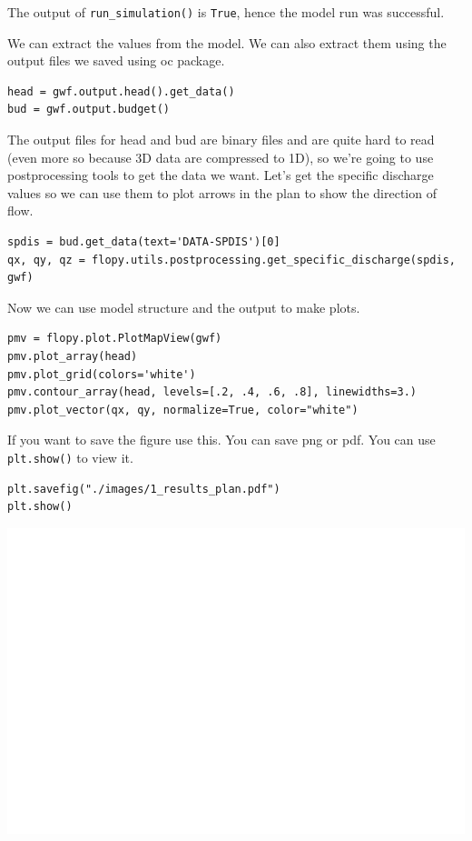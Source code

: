 \documentclass[titlepage,12pt]{unisubmission}
\begin{document}
The output of \texttt{run\_simulation()} is \texttt{True}, hence the model run was successful.

We can extract the values from the model. We can also extract them using the output files we saved using oc package.

\begin{verbatim}
head = gwf.output.head().get_data()
bud = gwf.output.budget()
\end{verbatim}

The output files for head and bud are binary files and are quite hard to read (even more so because 3D data are compressed to 1D), so we're going to use postprocessing tools to get the data we want. Let's get the specific discharge values so we can use them to plot arrows in the plan to show the direction of flow.

\begin{verbatim}
spdis = bud.get_data(text='DATA-SPDIS')[0]
qx, qy, qz = flopy.utils.postprocessing.get_specific_discharge(spdis, gwf)
\end{verbatim}

Now we can use model structure and the output to make plots.

\begin{verbatim}
pmv = flopy.plot.PlotMapView(gwf)
pmv.plot_array(head)
pmv.plot_grid(colors='white')
pmv.contour_array(head, levels=[.2, .4, .6, .8], linewidths=3.)
pmv.plot_vector(qx, qy, normalize=True, color="white")
\end{verbatim}

If you want to save the figure use this. You can save png or pdf. You can use \texttt{plt.show()} to view it.
\begin{verbatim}
plt.savefig("./images/1_results_plan.pdf")
plt.show()
\end{verbatim}

\begin{center}
\includegraphics[width=.9\linewidth]{./images/1_results_plan.pdf}
\end{center}
\end{document}
